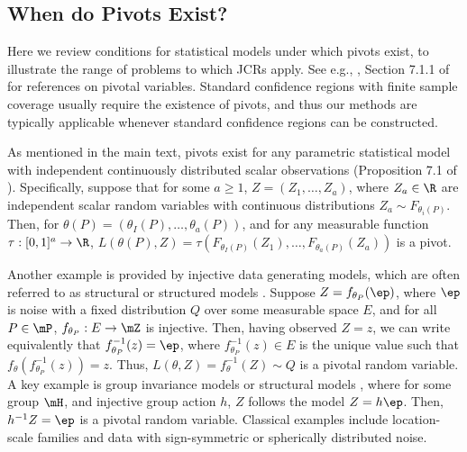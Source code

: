 \documentclass[english]{article}
\begin{document}
\subsection{When do Pivots Exist?}
\label{pive}
Here we review conditions for statistical models under which pivots exist, to illustrate the range of problems to which JCRs apply. 
See e.g.,
\cite{fraser1966structural,fraser1968structure,fraser1971events,brenner1983models,barnard1995pivotal,fraser1996some},
Section 7.1.1 of \cite{shao2003mathematical}
for references on pivotal variables.
Standard confidence regions with finite sample coverage usually 
require the existence of pivots,
and thus our methods are typically applicable whenever standard confidence regions can be constructed.

As mentioned in the main text, pivots exist for any parametric statistical model with independent continuously distributed scalar observations (Proposition 7.1 of \cite{shao2003mathematical}).
Specifically, suppose that
for some $a\ge 1$,
$Z = (Z_1, \ldots, Z_a)$, where $Z_a \in \R$ are independent scalar random variables with continuous distributions $Z_a\sim F_{\theta_i(P)}$. 
Then,
for $\theta(P) = (\theta_I(P),\ldots,\theta_a(P))$,
and for any measurable function $\tau:[0,1]^a\to \R$,
$L(\theta(P),Z) = \tau(F_{\theta_I(P)}(Z_1),\ldots,F_{\theta_a(P)}(Z_a))$
is a pivot.


Another example is provided by injective data generating models, which are often referred to as structural or structured models \citep{fraser1966structural,fraser1968structure,fraser1971events,brenner1983models,fraser1996some}. 
Suppose $Z = f_{\theta_P}(\ep)$, where $\ep$ is noise with a fixed distribution $Q$ over some measurable space $E$, and for all $P\in\mP$, $f_{\theta_P}:E\to \mZ$ is injective. 
Then, having observed $Z=z$, we can write equivalently that $f_{\theta_P}^{-1}(z)=\ep$,
where $f_{\theta_P}^{-1}(z) \in E$ is the unique value such that $f_\theta(f_{\theta_P}^{-1}(z))=z$.
Thus, $L(\theta,Z) = f_\theta^{-1}(Z)\sim Q$ 
is a pivotal random variable.
A key example is group invariance models or structural models \citep{fraser1968structure}, where for some group $\mH$, and injective group action $h $, $Z$ follows the model $Z = h \ep$. Then, $h^{-1}Z = \ep$ is a pivotal random variable.
Classical examples include location-scale families and data with sign-symmetric or spherically distributed noise.

\end{document}

